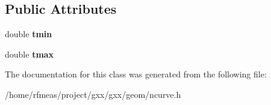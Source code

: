 \subsection*{Public Attributes}
\begin{DoxyCompactItemize}
\item 
double {\bfseries tmin}\hypertarget{classgxx_1_1ngeom_1_1bounded__curve_aba2a3d39bcd4779265f6fca5a2e51643}{}\label{classgxx_1_1ngeom_1_1bounded__curve_aba2a3d39bcd4779265f6fca5a2e51643}

\item 
double {\bfseries tmax}\hypertarget{classgxx_1_1ngeom_1_1bounded__curve_a2708098aec43031f7c4e697c9fba3e76}{}\label{classgxx_1_1ngeom_1_1bounded__curve_a2708098aec43031f7c4e697c9fba3e76}

\end{DoxyCompactItemize}


The documentation for this class was generated from the following file\+:\begin{DoxyCompactItemize}
\item 
/home/rfmeas/project/gxx/gxx/geom/ncurve.\+h\end{DoxyCompactItemize}
